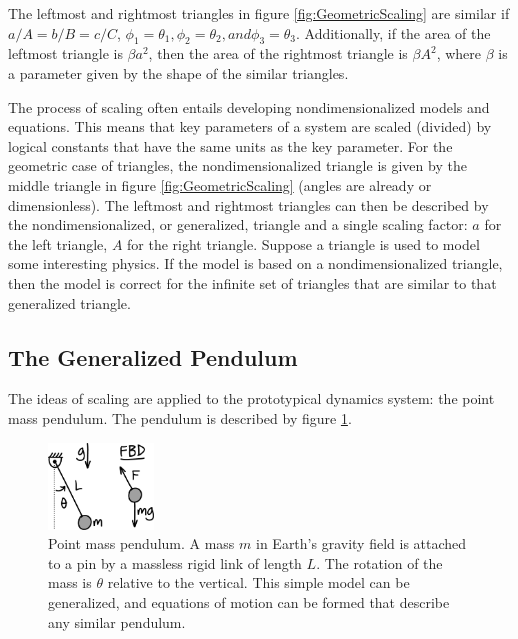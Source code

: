 The leftmost and rightmost triangles in figure \ref{fig:GeometricScaling} are similar if $a/A = b/B = c/C$, $\phi_{1} = \theta_{1}, \phi_{2} = \theta_{2}, and \phi_{3} = \theta_{3}$. Additionally, if the area of the leftmost triangle is $\beta a^2$, then the area of the rightmost triangle is $\beta A^2$, where $\beta$ is a parameter given by the shape of the similar triangles.

The process of scaling often entails developing nondimensionalized models and equations. This means that key parameters of a system are scaled (divided) by logical constants that have the same units as the key parameter. For the geometric case of triangles, the nondimensionalized triangle is given by the middle triangle in figure \ref{fig:GeometricScaling} (angles are already or dimensionless). The leftmost and rightmost triangles can then be described by the nondimensionalized, or generalized, triangle and a single scaling factor: $a$ for the left triangle, $A$ for the right triangle. Suppose a triangle is used to model some interesting physics. If the model is based on a nondimensionalized triangle, then the model is correct for the infinite set of triangles that are similar to that generalized triangle. 

\subsection{The Generalized Pendulum}

The ideas of scaling are applied to the prototypical dynamics system: the point mass pendulum. The pendulum is described by figure \ref{fig:Pendulum}.

\begin{figure}[h]		%
\begin{centering}
\includegraphics[width=0.25\textwidth]{Figures/Pendulum}\par
\end{centering}
\caption[Diagram: Point Mass Pendulum]{Point mass pendulum. A mass $m$ in Earth's gravity field is attached to a pin by a massless rigid link of length $L$. The rotation of the mass is $\theta$ relative to the vertical. This simple model can be generalized, and equations of motion can be formed that describe any similar pendulum.}
\label{fig:Pendulum}
\end{figure}
%

